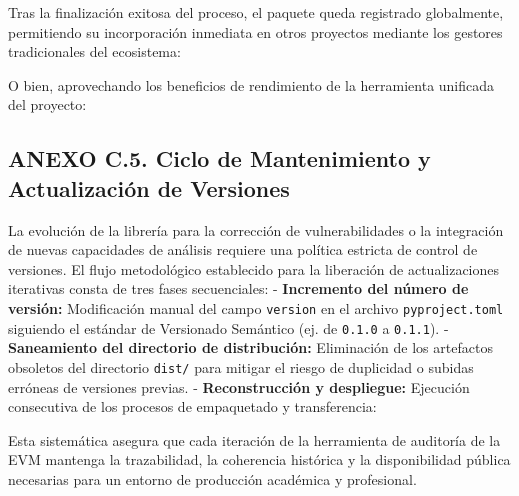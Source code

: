 Tras la finalización exitosa del proceso, el paquete queda registrado
globalmente, permitiendo su incorporación inmediata en otros proyectos
mediante los gestores tradicionales del ecosistema:

\begin{Shaded}
\begin{Highlighting}[]
\end{Highlighting}
\end{Shaded}

O bien, aprovechando los beneficios de rendimiento de la herramienta
unificada del proyecto:

\begin{Shaded}
\begin{Highlighting}[]
\end{Highlighting}
\end{Shaded}

\subsection{ANEXO C.5. Ciclo de Mantenimiento y Actualización de
Versiones}\label{anexo-c.5.-ciclo-de-mantenimiento-y-actualizaciuxf3n-de-versiones}

La evolución de la librería para la corrección de vulnerabilidades o la
integración de nuevas capacidades de análisis requiere una política
estricta de control de versiones. El flujo metodológico establecido para
la liberación de actualizaciones iterativas consta de tres fases
secuenciales: - \textbf{Incremento del número de versión:} Modificación
manual del campo \texttt{version} en el archivo \texttt{pyproject.toml}
siguiendo el estándar de Versionado Semántico (ej. de \texttt{0.1.0} a
\texttt{0.1.1}). - \textbf{Saneamiento del directorio de distribución:}
Eliminación de los artefactos obsoletos del directorio \texttt{dist/}
para mitigar el riesgo de duplicidad o subidas erróneas de versiones
previas. - \textbf{Reconstrucción y despliegue:} Ejecución consecutiva
de los procesos de empaquetado y transferencia:

\begin{Shaded}
\begin{Highlighting}[]
\end{Highlighting}
\end{Shaded}

Esta sistemática asegura que cada iteración de la herramienta de
auditoría de la EVM mantenga la trazabilidad, la coherencia histórica y
la disponibilidad pública necesarias para un entorno de producción
académica y profesional.
